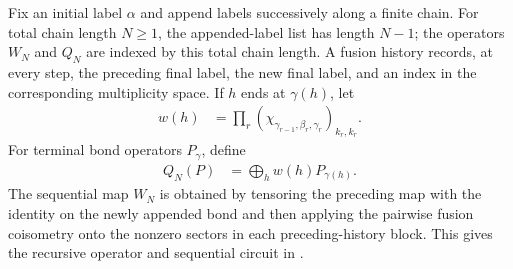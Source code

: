 \begin{definition}%
    \label{def:mpdo_topological_projector_recursion}
    \leanok
    Fix an initial label $\alpha$ and append labels successively along a
    finite chain. For total chain length $N\geq1$, the appended-label list
    has length $N-1$; the operators $W_N$ and $Q_N$ are indexed by this total
    chain length. A fusion history records, at every step, the preceding
    final label, the new final label, and an index in the corresponding
    multiplicity space. If $h$ ends at $\gamma(h)$, let
    \begin{align}
        w(h)
         & =\prod_r
        (\chi_{\gamma_{r-1},\beta_r,\gamma_r})_{k_r,k_r}.
        \label{eq:rfp_history_weight}
    \end{align}
    For terminal bond operators $P_\gamma$, define
    \begin{align}
        Q_N(P)
         & =\bigoplus_h w(h)P_{\gamma(h)}.
        \label{eq:rfp_recursive_q}
    \end{align}
    The sequential map $W_N$ is obtained by tensoring the preceding
    map with the identity on the newly appended bond and then applying the
    pairwise fusion coisometry onto the nonzero sectors in each
    preceding-history block.
    This gives the recursive operator and sequential circuit in
    \cite[lines~999--1010]{Cirac2016MPDO_arXiv}.
\end{definition}

